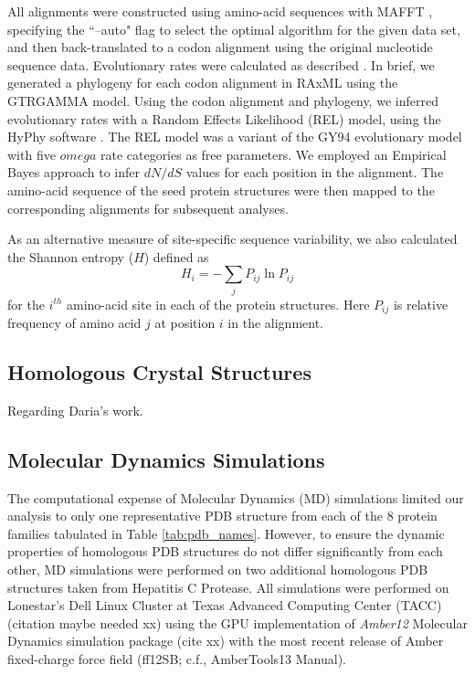 \documentclass[12pt]{article}
\begin{document}
All alignments were constructed using amino-acid sequences with MAFFT \citep{Katohetal2002,Katohetal2005}, specifying the ``--auto" flag to select the optimal algorithm for the given data set, and then back-translated to a codon alignment using the original nucleotide sequence data. Evolutionary rates were calculated as described \citep{SpielmanWilke2013}. In brief, we generated a phylogeny for each codon alignment in RAxML \citep{RaxMLHPC} using the GTRGAMMA model. Using the codon alignment and phylogeny, we inferred evolutionary rates with a Random Effects Likelihood (REL) model, using the HyPhy software \citep{KosakovskyPondetal2005}. The REL model was a variant of the GY94 evolutionary model \citep{GoldmanYang1994} with five $omega$ rate categories as free parameters. We employed an Empirical Bayes approach \citep{Yang2000} to infer $dN/dS$ values for each position in the alignment. The amino-acid sequence of the seed protein structures were then mapped to the corresponding alignments for subsequent analyses.

As an alternative measure of site-specific sequence variability, we also calculated the Shannon entropy ($H$) defined as
\begin{equation}
        H_i = - \sum_jP_{ij}\ln P_{ij}
\end{equation}
for the $i^{th}$ amino-acid site in each of the protein structures. Here $P_{ij}$ is relative frequency of amino acid $j$ at position $i$ in the alignment.


\subsection*{Homologous Crystal Structures}

        Regarding Daria's work.

\subsection*{Molecular Dynamics Simulations}

The computational expense of Molecular Dynamics (MD) simulations limited our analysis to only one representative PDB structure from each of the $8$ protein families tabulated in Table \ref{tab:pdb_names}. However, to ensure the dynamic properties of homologous PDB structures do not differ significantly from each other, MD simulations were performed on two additional homologous PDB structures taken from Hepatitis C Protease. All simulations were performed on Lonestar's Dell Linux Cluster at Texas Advanced Computing Center (TACC) (citation maybe needed xx) using the GPU implementation of {\it Amber12} Molecular Dynamics simulation package (cite xx) with the most recent release of Amber fixed-charge force field (ff12SB; c.f., AmberTools13 Manual).
		
\end{document}
